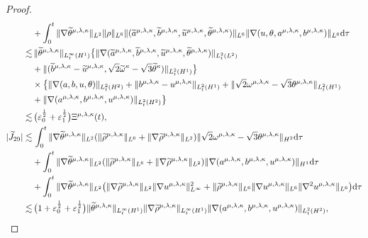 \documentclass[reqno,11pt]{amsart}
\theoremstyle{plain}
\numberwithin{equation}{section}
\newcommand{\eps}{{\varepsilon}}
\begin{document}
\begin{proof}
\begin{align}
&+\int_0^t \|\nabla\widetilde{\theta}^{\mu,\lambda,\kappa}\|_{L^2}\|\rho\|_{L^6}\| (\widetilde{a}^{\mu,\lambda,\kappa},\widetilde{b}^{\mu,\lambda,\kappa},\widetilde{u}^{\mu,\lambda,\kappa},\widetilde{\theta}^{\mu,\lambda,\kappa})\|_{L^6} \|\nabla(u,\theta, a^{\mu,\lambda,\kappa},b^{\mu,\lambda,\kappa})\|_{L^6}   {\rm d}\tau\nonumber\\
\lesssim&\,  \|\widetilde{\theta}^{\mu,\lambda,\kappa}\|_{L_t^\infty(H^1)}\big\{\|\nabla(\widetilde{a}^{\mu,\lambda,\kappa},\widetilde{b}^{\mu,\lambda,\kappa},\widetilde{u}^{\mu,\lambda,\kappa},\widetilde{\theta}^{\mu,\lambda,\kappa})\|_{L_t^2(L^2)}\nonumber\\
& +\|(\widetilde{b}^{\mu,\lambda,\kappa}-\widetilde{u}^{\mu,\lambda,\kappa},
\sqrt{2}\widetilde{\omega}^\kappa-\sqrt{3}\widetilde{\theta}^\kappa)\|_{L_t^2(H^1)}\big\}\nonumber\\
&  \times \big\{\|\nabla( {a} , {b} , {u} , {\theta} )\|_{L_t^2(H^2)}+\| {b}^{\mu,\lambda,\kappa} - {u}^{\mu,\lambda,\kappa}\|_{L_t^2(H^1)}+\|\sqrt{2} {\omega}^{\mu,\lambda,\kappa} -\sqrt{3} {\theta}^{\mu,\lambda,\kappa}\|_{L_t^2(H^1)}\nonumber\\
&  +\|\nabla(a^{\mu,\lambda,\kappa},b^{\mu,\lambda,\kappa},u^{\mu,\lambda,\kappa})\|_{L_t^2(H^2)}\big\}\nonumber\\
\lesssim&\, \big(\eps_0^\frac{1}{2}+\eps_1^\frac{1}{2}\big){\Xi} ^{\mu,\lambda,\kappa}(t),\label{G4.23-2}\\
|\widetilde{J}_{29}|\lesssim&\,\int_0^t \|\nabla\widetilde{\theta}^{\mu,\lambda,\kappa}\|_{L^2} (\|\widetilde{\rho}^{\mu,\lambda,\kappa}\|_{L^6}+\|\nabla\widetilde{\rho}^{\mu,\lambda,\kappa}\|_{L^2})\|\sqrt{2} {\omega}^{\mu,\lambda,\kappa} -\sqrt{3} {\theta}^{\mu,\lambda,\kappa} \|_{H^2} {\rm d}\tau\nonumber\\
&+\int_0^t \|\nabla\widetilde{\theta}^{\mu,\lambda,\kappa}\|_{L^2}(\|\widetilde{\rho}^{\mu,\lambda,\kappa}\|_{L^6}+\|\nabla\widetilde{\rho}^{\mu,\lambda,\kappa}\|_{L^2}) \|\nabla(a^{\mu,\lambda,\kappa},b^{\mu,\lambda,\kappa},u^{\mu,\lambda,\kappa})\|_{H^1} {\rm d}\tau\nonumber\\
&+\int_0^t \|\nabla\widetilde{\theta}^{\mu,\lambda,\kappa}\|_{L^2}\big(\|\nabla\widetilde{\rho}^{\mu,\lambda,\kappa}\|_{L^2}\|\nabla u^{\mu,\lambda,\kappa}\|_{L^\infty}^2+\|\widetilde{\rho}^{\mu,\lambda,\kappa}\|_{L^6}\|\nabla u^{\mu,\lambda,\kappa}\|_{L^6}\|\nabla^2 u^{\mu,\lambda,\kappa}\|_{L^6}\big){\rm d}\tau\nonumber\\
\lesssim&\,\big(1+\eps_0^\frac{1}{2}+\eps_1^\frac{1}{2}\big)\|\widetilde{\theta}^{\mu,\lambda,\kappa}\|_{L_t^\infty(H^1)} \|\nabla\widetilde{\rho}^{\mu,\lambda,\kappa}\|_{L_t^\infty(H^1)}  \|\nabla(a^{\mu,\lambda,\kappa},b^{\mu,\lambda,\kappa},u^{\mu,\lambda,\kappa})\|_{L_t^2(H^2)} ,\nonumber\\

\end{align}
\end{proof}
\end{document}
